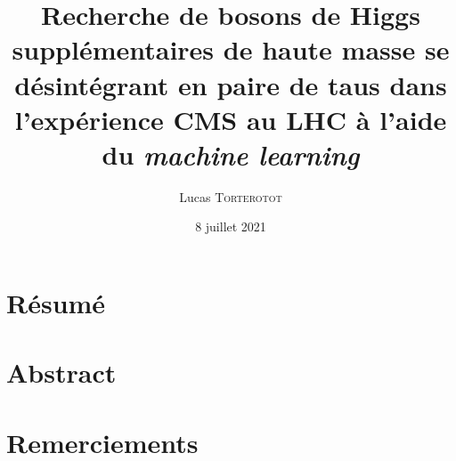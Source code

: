 \RequirePackage[log-declarations=false]{xparse}
\usepackage[none,nabla,seccolor,ppl,nosorting,minitoc]{ltstyle}
\usepackage{cmstransversetikz}



\def\insertlabo{Institut de Physique des 2 Infinis de Lyon}
\def\insertshortlabo{IP2I}

\title{Recherche de bosons de Higgs supplémentaires de haute masse se désintégrant en paire de taus dans l'expérience CMS au LHC à l'aide du \emph{machine learning}}
\author[L. \textsc{Torterotot}]{Lucas \textsc{Torterotot}}
\date{8 juillet 2021}
\imgcover{}
\editionsettings{}
\publisher{}


\pagestyle{empty}

\cleardoublepage
\pagestyle{empty}

\cleardoublepage
\chapter*{Résumé}\thispagestyle{empty}\pagestyle{empty}

\chapter*{Abstract}\thispagestyle{empty}\pagestyle{empty}

\cleardoublepage
\chapter*{Remerciements}\thispagestyle{empty}\pagestyle{empty}

\cleardoublepage
\frontmatter
\tableofcontents
\listoffigures
\listoftables
\mainmatter
{\markboth{}{}}

{\markboth{}{}}
\appendix\def\minitoc{}

\backmatter
\printbibliographyREF

